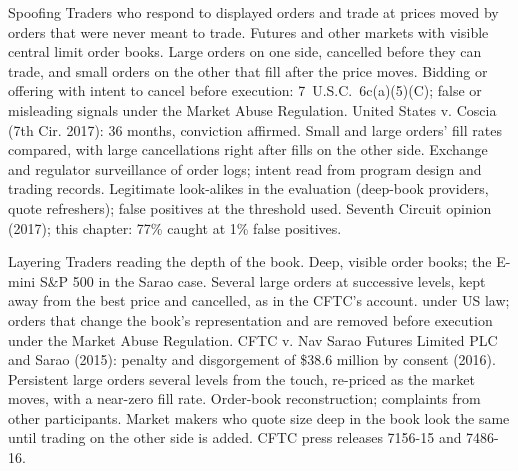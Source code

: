 \begin{strategyfile}{Spoofing}\label{strat:s2:manipulative-strategies-and-how-they-are-caught:spoofing}
 Traders who respond to displayed orders and trade at prices moved by orders that were never meant to trade.
 Futures and other markets with visible central limit order books.
 Large orders on one side, cancelled before they can trade, and small orders on the other that fill after the price moves.
 Bidding or offering with intent to cancel before execution: 7~U.S.C.~6c(a)(5)(C); false or misleading signals under the
Market Abuse Regulation.
 United States v. Coscia (7th Cir. 2017): 36 months, conviction affirmed.
 Small and large orders' fill rates compared, with large cancellations right after fills on the other side.
 Exchange and regulator surveillance of order logs; intent read from program design and trading records.
 Legitimate look-alikes in the evaluation (deep-book providers, quote refreshers); false positives at the
threshold used.
 Seventh Circuit opinion (2017); this chapter: 77\% caught at 1\% false positives.
\end{strategyfile}

\begin{strategyfile}{Layering}\label{strat:s2:manipulative-strategies-and-how-they-are-caught:layering}
 Traders reading the depth of the book.
 Deep, visible order books; the E-mini S\&P 500 in the Sarao case.
 Several large orders at successive levels, kept away from the best price and cancelled, as in the CFTC's account.
  under US law; orders that change the book's representation and are removed before execution under the Market Abuse
Regulation.
 CFTC v. Nav Sarao Futures Limited PLC and Sarao (2015): penalty and disgorgement of \$38.6 million by consent (2016).
 Persistent large orders several levels from the touch, re-priced as the market moves, with a near-zero fill rate.
 Order-book reconstruction; complaints from other participants.
 Market makers who quote size deep in the book look the same until trading on the other side is added.
 CFTC press releases 7156-15 and 7486-16.
\end{strategyfile}

